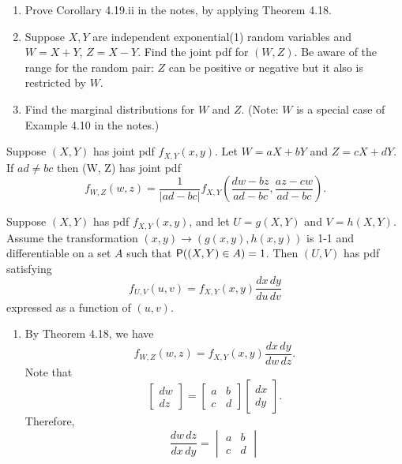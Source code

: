 \documentclass[12pt]{article}
\newcommand{\Prob}{{\sf P}}
\newenvironment{theorem}[2][Theorem]{\begin{trivlist}
\item[\hskip \labelsep {\bfseries #1}\hskip \labelsep {\bfseries #2.}]}
{\end{trivlist}}
\newenvironment{problem}[2][Problem]{\begin{trivlist}
\item[\hskip \labelsep {\bfseries #1}\hskip \labelsep {\bfseries #2.}]}
{\end{trivlist}}
\newenvironment{corollary}[2][Corollary]{\begin{trivlist}
\item[\hskip \labelsep {\bfseries #1}\hskip \labelsep {\bfseries #2.}]}
{\end{trivlist}}
\begin{document}
\begin{problem}{7}
  \begin{enumerate}
    \item Prove Corollary 4.19.ii in the notes, by applying Theorem 4.18.
    \item Suppose $X, Y$ are independent exponential(1) random variables 
    and $W = X + Y$, $Z = X - Y$. Find the joint pdf for $(W, Z)$. 
    Be aware of the range for the random pair: $Z$ can be positive or 
    negative but it also is restricted by $W$.
    \item Find the marginal distributions for $W$ and $Z$. 
    (Note: $W$ is a special case of Example 4.10 in the notes.)
  \end{enumerate}
  \begin{corollary}{4.19.ii} Suppose $(X, Y)$ has joint pdf $f_{X,Y}(x, y)$. 
    Let $W = aX + bY$ and $Z = cX + dY$. If $ad \neq bc$ 
    then (W, Z) has joint pdf
    \[
      f_{W,Z} (w, z) = \frac{1}{|ad - bc|} f_{X,Y} 
      \left( \frac{dw - bz}{ad - bc}, \frac{az - cw}{ad - bc} \right).
    \]
  \end{corollary}
  \begin{theorem}{4.18}
    Suppose $(X, Y )$ has pdf $f_{X,Y}(x, y)$, and let $U = g(X, Y)$ and
    $V = h(X, Y)$. Assume the transformation $(x, y) \to (g(x, y), h(x, y))$ 
    is 1-1 and differentiable on a set $A$ such that $\Prob((X, Y ) \in A) = 1$.
    Then $(U, V )$ has pdf satisfying
    \[
      f_{U,V} (u, v) = f_{X,Y} (x, y) \frac{dx \, dy}{du \, dv}
    \]
    expressed as a function of $(u, v)$.
  \end{theorem}
  \begin{enumerate}
    \item By Theorem 4.18, we have
    \[
      f_{W,Z} (w, z) = f_{X,Y} (x, y) \frac{dx \, dy}{dw \, dz}.
    \]
    Note that
    \[
      \begin{bmatrix}
        dw \\ dz
      \end{bmatrix} =
      \begin{bmatrix}
        a & b \\ c & d
      \end{bmatrix}
      \begin{bmatrix}
        dx \\ dy
      \end{bmatrix}.
    \]
    Therefore,
    \[
      \frac{dw \, dz}{dx \, dy} = 
      \begin{vmatrix}
        a & b \\ c & d

\end{vmatrix}\]
\end{enumerate}
\end{problem}
\end{document}
